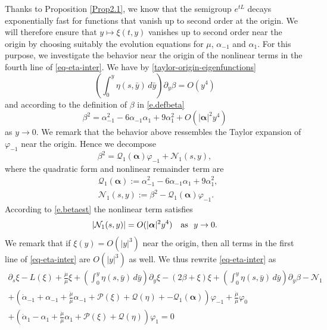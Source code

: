 \documentclass[12pt]{amsart}
\numberwithin{equation}{section}
\numberwithin{equation}{section}
\begin{document}
Thanks to Proposition \ref{Prop2.1}, we know that the semigroup $e^{tL}$ decays exponentially fast for functions that vanish up to second order at the origin. We will therefore ensure that $y\mapsto \xi(t,y)$ vanishes up to second order near the origin by choosing suitably the evolution equations for $\mu$, $\alpha_{-1}$ and $\alpha_1$. For this purpose, we investigate the behavior near the origin of the nonlinear terms in the fourth line of \eqref{eq-eta-inter}. We have by \eqref{taylor-origin-eigenfunctions}
$$
\left(\int_{0}^y \eta(s,  \bar y) \,d\bar y  \right) \partial_y  \beta =O(y^4)
$$
and according to the definition of $\beta$ in \eqref{e.defbeta}
\begin{equation}\label{e.betaest}
\beta^2=\alpha_{-1}^2-6\alpha_{-1}\alpha_1+9\alpha_1^2+O({|\boldsymbol{\alpha}|^2}y^4)
\end{equation}
as $y\to 0$. We remark that the behavior above ressembles the Taylor expansion of $\varphi_{-1}$ near the origin. Hence we decompose
$$
\beta^2=  \mathcal{Q}_1(\boldsymbol{\alpha})\varphi_{-1}+\mathcal N_1(s, y),
$$
 where the quadratic form and nonlinear remainder term are
\begin{align*}
& \mathcal{Q}_1(\boldsymbol{\alpha}):=  \alpha_{-1}^2-6\alpha_{-1}\alpha_1+9\alpha_1^2,\\
& \mathcal{N}_1(s, y):=\beta^2-  \mathcal{Q}_1(\boldsymbol{\alpha})\varphi_{-1}.
\end{align*}
According to \eqref{e.betaest} the nonlinear term satisfies
\begin{equation}\label{taylorexpansionN}
|\mathcal{N}_1(s, y)|=O(|\boldsymbol{\alpha}|^2 y^4) \quad {\rm as}~~y\to 0.
\end{equation}
We remark that if $\xi(y)=O(|y|^3)$ near the origin, then all terms in the first line of \eqref{eq-eta-inter} are $O(|y|^3)$ as well. We thus rewrite \eqref{eq-eta-inter} as
  \begin{multline}\label{eq-eta-inter-2}
 \partial_s \xi - L (\xi) +\frac{\dot\mu }{\mu} \xi + \left(\int_{0}^y \eta(s,  \bar y) \,d\bar y\right) \partial_y \xi -\left(2\beta+\xi \right)\xi +  \left(\int_0^y \eta(s,  \bar y)\,d\bar y\right)\partial_y \beta- \mathcal{N}_1\\
 +\left(\dot\alpha_{-1}+\alpha_{-1}+\frac{\dot\mu}{\mu}\alpha_{-1}+\mathcal P(\xi)+\mathcal Q(\eta)+-\mathcal{Q}_1(\boldsymbol{\alpha})\right)\varphi_{-1}+\frac{\dot\mu}{\mu} \varphi_0\\
 +\left(\dot\alpha_{1}-\alpha_{1}+\frac{\dot\mu}{\mu}\alpha_{1}+\mathcal P (\xi)+\mathcal Q (\eta)\right)\varphi_{1}=0
\end{multline}
\end{document}
